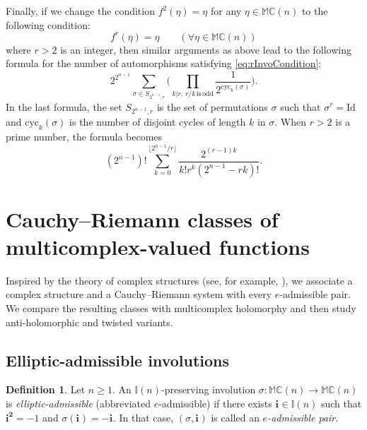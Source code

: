 \documentclass[12pt]{amsart}
\theoremstyle{plain}
\theoremstyle{definition}
\newtheorem{definition}[theorem]{Definition}
\numberwithin{equation}{section}
\newcommand{\im}[1]{\mathbf{ i_{#1}}}
\newcommand{\ims}[1]{\mathbf{ i_{#1}^2}}
\newcommand{\mC}{\mathbb{C}}
\newcommand{\mM}{\mathbb{M}}
\newcommand{\mI}{\mathbb{I}}
\begin{document}
Finally, if we change the condition $f^2 (\eta) = \eta$ for any $\eta \in \mM \mC (n)$ to the following condition: 
    \begin{equation}
        f^r (\eta ) = \eta \qquad (\forall \eta \in \mM \mC (n)) \label{eq:rInvoCondition}
    \end{equation}
where $r > 2$ is an integer, then similar arguments as above lead to the following formula for the number of automorphisms satisfying \eqref{eq:rInvoCondition}:
$$
        2^{2^{n-1}}\sum_{\sigma\in S_{2^{n-1},r}}\Big(\prod_{k|r,\, r/k \mathrm{\, is\, odd}}\frac{1}{2^{\mathrm{cyc}_k(\sigma)}}\Big).
    $$
In the last formula, the set $S_{2^{n-1}, r}$ is the set of permutations $\sigma$ such that $\sigma^r = \mathrm{Id}$ and $\mathrm{cyc}_k (\sigma )$ is the number of disjoint cycles of length $k$ in $\sigma$. When $r > 2$ is a prime number, the formula becomes
    $$
        (2^{n-1})!\sum_{k=0}^{\lfloor 2^{n-1}/r\rfloor}\frac{2^{(r-1)k}}{k!r^k(2^{n-1}-rk)!} .
    $$


\section{Cauchy--Riemann classes of multicomplex-valued functions}\label{S:classesMonoFunctions}
Inspired by the theory of complex structures (see, for example, \cite{Huybrechts2005}), we associate a complex structure and a Cauchy--Riemann system with every $e$-admissible pair. We compare the resulting classes with multicomplex holomorphy and then study anti-holomorphic and twisted variants.

\subsection{Elliptic-admissible involutions}\label{SS:EAdmissibleCounting}

\begin{definition}\label{D:EAdmissible}
Let $n\geq 1$. An $\mI (n)$-preserving involution $\sigma:\mM \mC(n)\to\mM \mC(n)$ is \emph{elliptic-admissible} (abbreviated $e$-admissible) if there exists $\im{}\in\mI(n)$ such that $\ims{}=-1$ and $\sigma(\im{})=-\im{}$. In that case, $(\sigma,\im{})$ is called an \emph{$e$-admissible pair}.
\end{definition}
\end{document}

